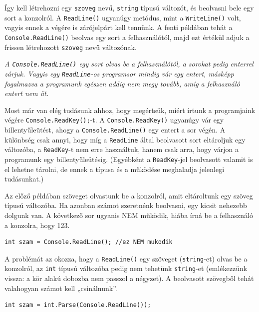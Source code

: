 \documentclass[a4paper]{article}
\begin{document}
	Így kell létrehozni egy \lstinline{szoveg} nevű, \lstinline{string} típusú változót, és beolvasni bele egy sort a konzolról. A \lstinline{ReadLine()} ugyanúgy metódus, mint a \lstinline{WriteLine()} volt, vagyis ennek a végére is zárójelpárt kell tennünk. A fenti példában tehát a \lstinline{Console.ReadLine()} beolvas egy sort a felhasználótól, majd ezt értékül adjuk a frissen létrehozott \lstinline{szoveg} nevű változónak.
	
	\emph{A \lstinline{Console.ReadLine()} egy sort olvas be a felhasználótól, a sorokat pedig enterrel zárjuk. Vagyis egy \lstinline{ReadLine}-os programsor mindig vár egy entert, másképp fogalmazva a programunk egészen addig nem megy tovább, amíg a felhasználó entert nem üt.}
	
	Most már van elég tudásunk ahhoz, hogy megértsük, miért írtunk a programjaink végére \lstinline{Console.ReadKey();}-t. A \lstinline{Console.ReadKey()} ugyanúgy vár egy billentyűleütést, ahogy a \lstinline{Console.ReadLine()} egy entert a sor végén. A különbség csak annyi, hogy míg a \lstinline{ReadLine} által beolvasott sort eltároljuk egy változóba, a \lstinline{ReadKey}-t nem erre használtuk, hanem csak arra, hogy várjon a programunk egy billentyűleütésig. (Egyébként a \lstinline{ReadKey}-jel beolvasott valamit is el lehetne tárolni, de ennek a típusa és a működése meghaladja jelenlegi tudásunkat.)
	
	Az előző példában szöveget olvastunk be a konzolról, amit eltároltunk egy szöveg típusú változóba. Ha azonban számot szeretnénk beolvasni, egy kicsit nehezebb dolgunk van. A következő sor ugyanis NEM működik, hiába írná be a felhasználó a konzolra, hogy 123.
	
	\begin{lstlisting}[caption=Hibás beolvasás, label=lst:readWrong]
		int szam = Console.ReadLine(); //ez NEM mukodik
	\end{lstlisting}
	
	A problémát az okozza, hogy a \lstinline{ReadLine()} egy szöveget (\lstinline{string}-et) olvas be a konzolról, az \lstinline{int} típusú változóba pedig nem tehetünk \lstinline{string}-et (emlékezzünk vissza: a kör alakú dobozba nem passzol a négyzet). A beolvasott szövegből tehát valahogyan számot kell „csinálnunk”.
	
	\begin{lstlisting}[caption=Egész szám beolvasása, label=lst:readIntParse]
		int szam = int.Parse(Console.ReadLine());
	\end{lstlisting}
	
\end{document}
